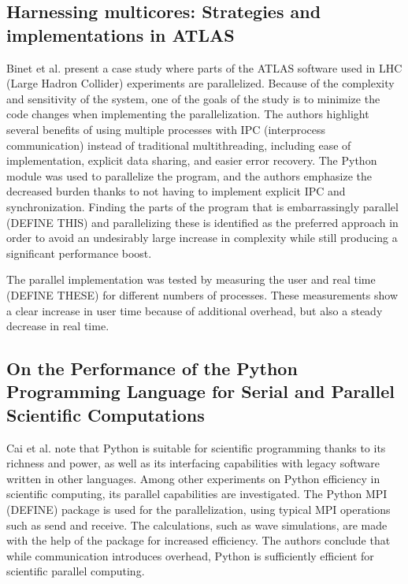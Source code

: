 \subsection{Harnessing multicores: Strategies and implementations in ATLAS}
Binet et al. \cite{binet_2010_harnessing_hmsaiia} present a case study where parts of the ATLAS software used in
LHC (Large Hadron Collider) experiments are parallelized. Because of the complexity and sensitivity of the system,
one of the goals of the study is to minimize the code changes when implementing the parallelization. The authors highlight several
benefits of using multiple processes with IPC (interprocess communication) instead of traditional multithreading, including ease of 
implementation, explicit data sharing, and easier error recovery. The Python  module was used to parallelize
the program, and the authors emphasize the decreased burden thanks to not having to implement explicit IPC and synchronization.
Finding the parts of the program that is embarrassingly parallel (DEFINE THIS) and parallelizing these is
identified as the preferred approach in order to avoid an undesirably large increase in complexity while
still producing a significant performance boost.

The parallel implementation was tested by measuring the user and real time (DEFINE THESE) for different numbers of processes.
These measurements show a clear increase in user time because of additional overhead, but also a steady decrease in real time.

\subsection{On the Performance of the Python Programming Language for Serial and Parallel Scientific Computations}
Cai et al. \cite{cai_2005_performance_otpotpplfsapsc} note that Python is suitable for scientific programming thanks to its richness and
power, as well as its interfacing capabilities with legacy software written in other languages. Among other experiments on Python
efficiency in scientific computing, its parallel capabilities are investigated. The Python MPI (DEFINE) package  is used for
the parallelization, using typical MPI operations such as send and receive. The calculations, such as wave simulations, 
are made with the help of the  package for increased efficiency. The authors conclude that while communication 
introduces overhead, Python is sufficiently efficient for scientific parallel computing.


